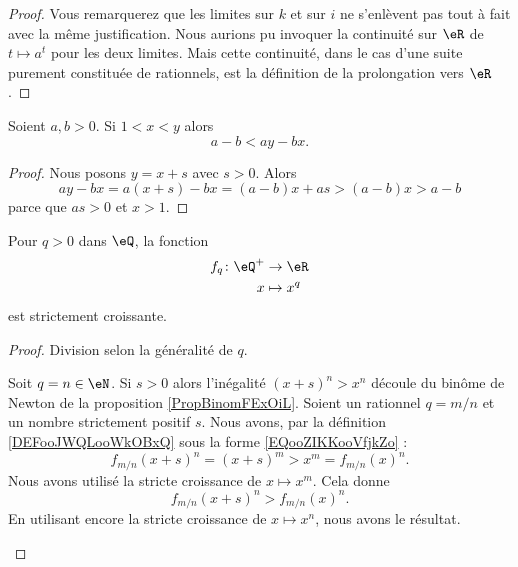 \begin{proof}
	Vous remarquerez que les limites sur \( k\) et sur \( i\) ne s'enlèvent pas tout à fait avec la même justification. Nous aurions pu invoquer la continuité sur \( \eR\) de \( t\mapsto a^t\) pour les deux limites. Mais cette continuité, dans le cas d'une suite purement constituée de rationnels, est la définition de la prolongation vers \( \eR\).
\end{proof}

\begin{lemma}       \label{LEMooIPLLooCgpCIn}
	Soient \( a,b>0\). Si \( 1<x<y\) alors
	\begin{equation}
		a-b<ay-bx.
	\end{equation}
\end{lemma}

\begin{proof}
	Nous posons \( y=x+s\) avec \( s>0\). Alors
	\begin{equation}
		ay-bx=a(x+s)-bx=(a-b)x+as>(a-b)x>a-b
	\end{equation}
	parce que \( as>0\) et \( x>1\).
\end{proof}

\begin{proposition}      \label{PROPooJXHFooCDwxCS}
	Pour \( q>0\) dans \( \eQ\), la fonction
	\begin{equation}
		\begin{aligned}
			f_{q}\colon \eQ^+ & \to \eR       \\
			x                 & \mapsto x^{q}
		\end{aligned}
	\end{equation}
	est strictement croissante.
\end{proposition}

\begin{proof}
	Division selon la généralité de \(q\).
	\begin{subproof}
		Soit \( q=n\in \eN\). Si \( s>0\) alors l'inégalité \( (x+s)^n>x^n\) découle du binôme de Newton de la proposition \ref{PropBinomFExOiL}.
		Soient un rationnel \( q=m/n\) et un nombre strictement positif \( s\). Nous avons, par la définition \ref{DEFooJWQLooWkOBxQ} sous la forme \eqref{EQooZIKKooVfjkZo} :
		\begin{equation}
			f_{m/n}(x+s)^n=(x+s)^m>x^m=f_{m/n}(x)^n.
		\end{equation}
		Nous avons utilisé la stricte croissance de \( x\mapsto x^m\). Cela donne
		\begin{equation}
			f_{m/n}(x+s)^n>f_{m/n}(x)^n.
		\end{equation}
		En utilisant encore la stricte croissance de \( x\mapsto x^n\), nous avons le résultat.
	\end{subproof}
\end{proof}

